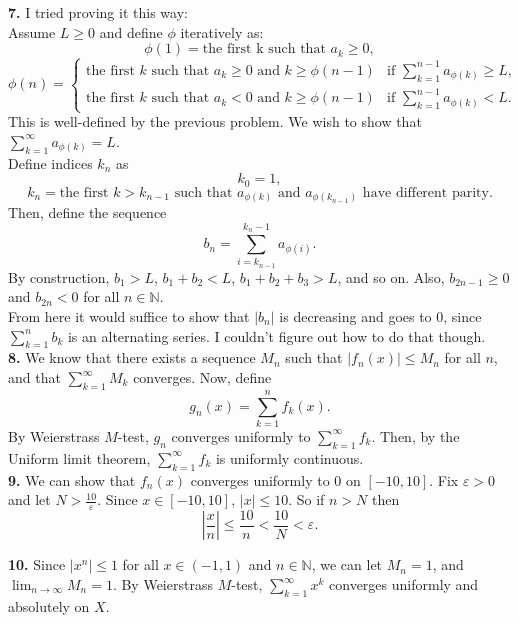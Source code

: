 \documentclass{article}
\newcommand{\N}{\mathbb{N}}
\newcommand{\eps}{\varepsilon}
\begin{document}
\textbf{7.} I tried proving it this way: \\

Assume $L \ge 0$ and define $\phi$ iteratively as:
$$\phi(1) = \text{the first k such that } a_k \ge 0,$$
$$\phi(n) = \begin{cases}
    \text{the first } k \text{ such that } a_k \ge 0 \text{ and } k \ge \phi(n - 1) & \text{if } \sum_{k = 1}^{n - 1} a_{\phi(k)} \ge L, \\
    \text{the first } k \text{ such that } a_k < 0 \text{ and } k \ge \phi(n - 1) & \text{if } \sum_{k = 1}^{n - 1} a_{\phi(k)} < L.
\end{cases}$$
This is well-defined by the previous problem. We wish to show that $\sum_{k = 1}^\infty a_{\phi(k)} = L$. \\

Define indices $k_n$ as
$$k_0 = 1,$$
$$k_n = \text{the first } k > k_{n - 1} \text{ such that } a_{\phi(k)} \text{ and } a_{\phi(k_{n - 1})} \text{ have different parity}.$$
Then, define the sequence
$$b_n = \sum_{i = k_{n - 1}}^{k_n - 1} a_{\phi(i)}.$$
By construction, $b_1 > L$, $b_1 + b_2 < L$, $b_1 + b_2 + b_3 > L$, and so on. Also, $b_{2n - 1} \ge 0$ and $b_{2n} < 0$ for all $n \in \N$. \\

From here it would suffice to show that $|b_n|$ is decreasing and goes to $0$, since $\sum_{k = 1}^n b_k$ is an alternating series. I couldn't figure out how to do that though. \\

\textbf{8.} We know that there exists a sequence $M_n$ such that $|f_n(x)| \le M_n$ for all $n$, and that $\sum_{k = 1}^\infty M_k$ converges. Now, define
$$g_n(x) = \sum_{k = 1}^n f_k(x).$$
By Weierstrass $M$-test, $g_n$ converges uniformly to $\sum_{k = 1}^\infty f_k$. Then, by the Uniform limit theorem, $\sum_{k = 1}^\infty f_k$ is uniformly continuous. \\

\textbf{9.} We can show that $f_n(x)$ converges uniformly to $0$ on $[-10, 10]$. Fix $\eps > 0$ and let $N > \frac{10}{\eps}$. Since $x \in [-10, 10]$, $|x| \le 10$. So if $n > N$ then
$$\left|\frac{x}{n}\right| \le \frac{10}{n} < \frac{10}{N} < \eps.$$

\textbf{10.} Since $|x^n| \le 1$ for all $x \in (-1, 1)$ and $n \in \N$, we can let $M_n = 1$, and $\lim_{n\to\infty} M_n = 1$. By Weierstrass $M$-test, $\sum_{k = 1}^\infty x^k$ converges uniformly and absolutely on $X$. \\
\end{document}
